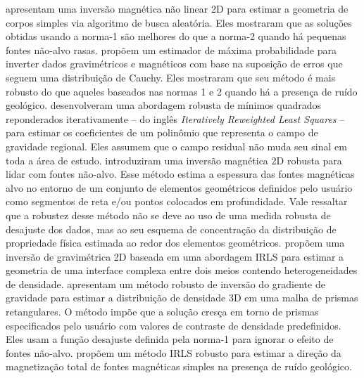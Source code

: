 \citet{silva_hohmann1983} apresentam uma inversão magnética não linear 2D para estimar a geometria de corpos simples via algoritmo de busca aleatória. Eles mostraram que as soluções obtidas usando a norma-1 são melhores do que a norma-2 quando há pequenas fontes não-alvo rasas. 
\citet{silva_cutrim1989} propõem um estimador de máxima probabilidade para inverter dados gravimétricos e magnéticos com base na suposição de erros que seguem uma distribuição de Cauchy.
Eles mostraram que seu método é mais robusto do que aqueles baseados nas normas 1 e 2 quando há a presença de ruído geológico.
\citet{beltrao_etal1991} desenvolveram uma abordagem robusta de mínimos quadrados reponderados iterativamente -- do inglês \textit{Iteratively Reweighted Least Squares} \citep{scales_gersztenkorn1988} -- para estimar os coeficientes de um polinômio que representa o campo de gravidade regional. 
Eles assumem que o campo residual não muda seu sinal em toda a área de estudo. 
\citet{barbosa_silva2006} introduziram uma inversão magnética 2D robusta para lidar com fontes não-alvo.
Esse método estima a espessura das fontes magnéticas alvo no entorno de um conjunto de elementos geométricos definidos pelo usuário como segmentos de reta e/ou pontos colocados em profundidade. 
Vale ressaltar que a robustez desse método não se deve ao uso de uma medida robusta de desajuste dos dados, mas ao seu esquema de concentração da distribuição de propriedade física estimada ao redor dos elementos geométricos. 
\citet{silva_dias_etal2007} propõem uma inversão de gravimétrica 2D baseada em uma abordagem IRLS para estimar a geometria de uma interface complexa entre dois meios contendo
heterogeneidades de densidade. 
\citet{uieda_barbosa2012} apresentam um método robusto de inversão do gradiente de gravidade para estimar a distribuição de densidade 3D em uma malha de prismas retangulares.
O método impõe que a solução cresça em torno de prismas especificados pelo usuário com valores de contraste de densidade predefinidos. Eles usam a função desajuste definida pela norma-1 para ignorar o efeito de fontes não-alvo.
\citet{oliveirajr_etal2015} propõem um método IRLS robusto para estimar a direção da magnetização total de fontes magnéticas simples na presença de ruído geológico.


